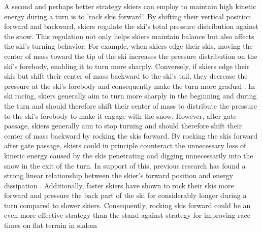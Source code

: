 A second and perhaps better strategy skiers can employ to maintain high kinetic energy during a turn is to 'rock skis forward'. By shifting their vertical position forward and backward, skiers regulate the ski’s total pressure distribution against the snow\cite{lemaster_skiers_1999, lemaster_ultimate_2010, howe_new_2001}. This regulation not only helps skiers maintain balance but also affects the ski's turning behavior. For example, when skiers edge their skis, moving the center of mass toward the tip of the ski increases the pressure distribution on the ski's forebody, enabling it to turn more sharply. Conversely, if skiers edge their skis but shift their center of mass backward to the ski's tail, they decrease the pressure at the ski's forebody and consequently make the turn more gradual \cite{lemaster_skiers_1999, lemaster_ultimate_2010}. In ski racing, skiers generally aim to turn more sharply in the beginning and during the turn and should therefore shift their center of mass to distribute the pressure to the ski's forebody to make it engage with the snow. However, after gate passage, skiers generally aim to stop turning and should therefore shift their center of mass backward by rocking the skis forward. By rocking the skis forward after gate passage, skiers could in principle counteract the unnecessary loss of kinetic energy caused by the skis penetrating and digging unnecessarily into the snow in the exit of the turn. In support of this, previous research has found a strong linear relationship between the skier's forward position and energy dissipation \cite{reid_turn_2009}. Additionally, faster skiers have shown to rock their skis more forward and pressure the back part of the ski for considerably longer during a turn compared to slower skiers\cite{reid_kinematic_2010, tjorhom_beskrivelse_2007}. Consequently, rocking skis forward could be an even more effective strategy than the stand against strategy for improving race times on flat terrain in slalom 


